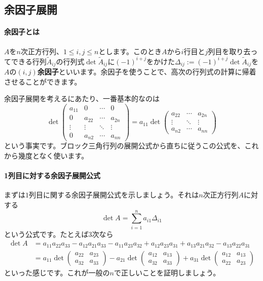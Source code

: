 \subsection{余因子展開}

\paragraph{余因子とは}

$A$を$n$次正方行列、$1 \leq i, j \leq n$とします。このとき$A$から$i$行目と$j$列目を取り去ってできる行列$\tilde{A}_{ij}$の行列式$\det \tilde{A}_{ij}$に$(-1)^{i + j}$をかけた$\Delta_{ij} := (-1)^{i + j}\det \tilde{A}_{ij}$を$A$の\textbf{$(i, j)$余因子}といいます。余因子を使うことで、高次の行列式の計算に帰着させることができます。

余因子展開を考えるにあたり、一番基本的なのは
\[
\det
\begin{pmatrix}
a_{11} & 0 & \cdots & 0 \\
0 & a_{22} & \cdots & a_{2n} \\
\vdots & \vdots & \ddots & \vdots \\
0 & a_{n2} & \cdots & a_{nn}
\end{pmatrix}
= a_{11} \det
\begin{pmatrix}
a_{22} & \cdots & a_{2n} \\
\vdots & \ddots & \vdots \\
a_{n2} & \cdots & a_{nn}
\end{pmatrix}
\]
という事実です。ブロック三角行列の展開公式から直ちに従うこの公式を、これから幾度となく使います。

\paragraph{1列目に対する余因子展開公式}

まずは$1$列目に関する余因子展開公式を示しましょう。それは$n$次正方行列$A$に対する
\[
\det A = \sum_{i = 1}^n a_{i1} \Delta_{i1}
\]
という公式です。たとえば$3$次なら
\begin{align*}
\det A 
&= a_{11} a_{22} a_{33} - a_{12} a_{21} a_{33} - a_{11} a_{23} a_{32} + a_{12} a_{23} a_{31} + a_{13} a_{21} a_{32} - a_{13} a_{22} a_{31} \\
&= a_{11} \det
\begin{pmatrix}
a_{22} & a_{23} \\
a_{32} & a_{33}
\end{pmatrix}
- a_{21} \det
\begin{pmatrix}
a_{12} & a_{13} \\
a_{32} & a_{33}
\end{pmatrix}
+ a_{31} \det
\begin{pmatrix}
a_{12} & a_{13} \\
a_{22} & a_{23}
\end{pmatrix}
\end{align*}
といった感じです。これが一般の$n$で正しいことを証明しましょう。

